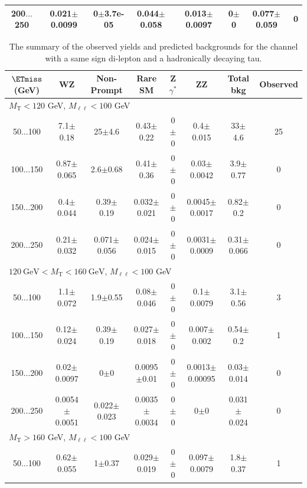 \begin{landscape}
\begin{table}
\begin{center}
\begin{tabular}{| c | c c c c c c c | }
200$\dots$250&0.021$\pm$0.0099&0$\pm$3.7e-05&0.044$\pm$0.058&0.013$\pm$0.0097&0$\pm$0&0.077$\pm$0.059&0\\
\hline\hline
\end{tabular}
\end{center}
\end{table}
\begin{table}
\small
\begin{center}
\caption{\label{tab:SStau1} The summary of the observed yields and predicted backgrounds for the channel with a same sign di-lepton and a hadronically decaying tau. }
\begin{tabular}{| c | c c c c c c c | }\hline\hline
$\ETmiss$ (GeV) & WZ & Non-Prompt & Rare SM & Z$\gamma^*$ & ZZ & Total bkg & Observed\\\hline\hline
\multicolumn{8}{l}{$M_{\text{T}} < 120$ GeV, $M_{\ell\ell} < 100$ GeV}\\\hline\hline
50$\dots$100&7.1$\pm$0.18&25$\pm$4.6&0.43$\pm$0.22&0$\pm$0&0.4$\pm$0.015&33$\pm$4.6&25\\
100$\dots$150&0.87$\pm$0.065&2.6$\pm$0.68&0.41$\pm$0.36&0$\pm$0&0.03$\pm$0.0042&3.9$\pm$0.77&0\\
150$\dots$200&0.4$\pm$0.044&0.39$\pm$0.19&0.032$\pm$0.021&0$\pm$0&0.0045$\pm$0.0017&0.82$\pm$0.2&0\\
200$\dots$250&0.21$\pm$0.032&0.071$\pm$0.056&0.024$\pm$0.015&0$\pm$0&0.0031$\pm$0.0009&0.31$\pm$0.066&0\\
\hline\hline
\multicolumn{8}{l}{$120~\mathrm{GeV} < M_{\text{T}} < 160~\mathrm{GeV}$, $M_{\ell\ell} < 100$ GeV}\\\hline\hline
50$\dots$100&1.1$\pm$0.072&1.9$\pm$0.55&0.08$\pm$0.046&0$\pm$0&0.1$\pm$0.0079&3.1$\pm$0.56&3\\
100$\dots$150&0.12$\pm$0.024&0.39$\pm$0.19&0.027$\pm$0.018&0$\pm$0&0.007$\pm$0.002&0.54$\pm$0.2&1\\
150$\dots$200&0.02$\pm$0.0097&0$\pm$0&0.0095$\pm$0.01&0$\pm$0&0.0013$\pm$0.00095&0.03$\pm$0.014&0\\
200$\dots$250&0.0054$\pm$0.0051&0.022$\pm$0.023&0.0035$\pm$0.0034&0$\pm$0&0$\pm$0&0.031$\pm$0.024&0\\
\hline\hline
\multicolumn{8}{l}{$M_{\text{T}} > 160$ GeV, $M_{\ell\ell} < 100$ GeV}\\\hline\hline
50$\dots$100&0.62$\pm$0.055&1$\pm$0.37&0.029$\pm$0.019&0$\pm$0&0.097$\pm$0.0079&1.8$\pm$0.37&1\\

\end{tabular}
\end{center}
\end{table}
\end{landscape}
